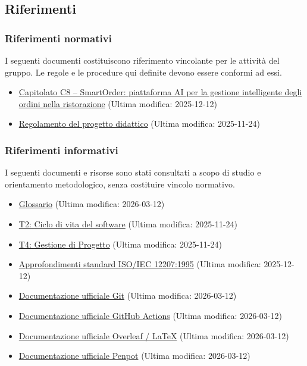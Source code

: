 \documentclass[a4paper, 11pt, oneside]{scrartcl}
\begin{document}
\subsection{Riferimenti}

\subsubsection{Riferimenti normativi}
I seguenti documenti costituiscono riferimento vincolante per le attività del gruppo.
Le regole e le procedure qui definite devono essere conformi ad essi.

\begin{itemize}
    \item \href{URL_CAPITOLATO_C8}{Capitolato C8 – SmartOrder: piattaforma AI per la gestione intelligente degli ordini nella ristorazione} (Ultima modifica: 2025-12-12)
    \item \href{URL_REGOLAMENTO}{Regolamento del progetto didattico} (Ultima modifica: 2025-11-24)
\end{itemize}

\subsubsection{Riferimenti informativi}
I seguenti documenti e risorse sono stati consultati a scopo di studio e orientamento metodologico, senza costituire vincolo normativo.

\begin{itemize}
    \item \href{URL_GLOSSARIO}{Glossario} (Ultima modifica: 2026-03-12)
    \item \href{https://www.math.unipd.it/~tullio/IS-1/2025/Dispense/T2.pdf}{T2: Ciclo di vita del software} (Ultima modifica: 2025-11-24)
    \item \href{https://www.math.unipd.it/~tullio/IS-1/2025/Dispense/T4.pdf}{T4: Gestione di Progetto} (Ultima modifica: 2025-11-24)
    \item \href{https://www.math.unipd.it/~rcardin/swea/2021/Lezione-ArchiSW-1.pdf}{Approfondimenti standard ISO/IEC 12207:1995} (Ultima modifica: 2025-12-12)
    \item \href{https://git-scm.com/doc}{Documentazione ufficiale Git} (Ultima modifica: 2026-03-12)
    \item \href{https://docs.github.com/en/actions}{Documentazione ufficiale GitHub Actions} (Ultima modifica: 2026-03-12)
    \item \href{https://www.overleaf.com/learn}{Documentazione ufficiale Overleaf / \LaTeX{}} (Ultima modifica: 2026-03-12)
    \item \href{https://help.penpot.app}{Documentazione ufficiale Penpot} (Ultima modifica: 2026-03-12)
\end{itemize}
\end{document}
